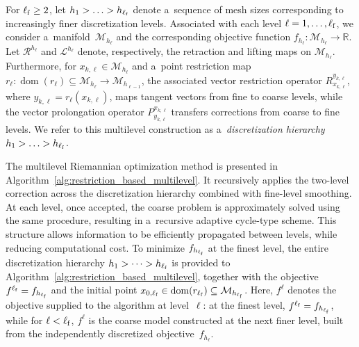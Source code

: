 \documentclass[11pt,reqno]{amsart}
\theoremstyle{plain}
\newcommand\R{\mathbb R}
\DeclareMathOperator{\dom}{dom}
\def\restr{r}
\newcommand{\M}{\mathcal{M}}
\newcommand{\Ret}{\mathcal R}
\newcommand{\invRet}{\mathcal L}
\begin{document}
	For $\ell_{\rm f}\ge2$, let $h_1 > \ldots > h_{\ell_{\rm f}}$ denote a~sequence of mesh sizes corresponding to increasingly finer discretization levels. Associated with each level $\ell=1,\ldots,\ell_{\rm f}$, we consider a~manifold~$\M_{h_\ell}$ and the corresponding objective function $f_{h_\ell}:\M_{h_\ell}\to\R$. Let $\Ret^{h_\ell}$ and $\invRet^{h_\ell}$ denote, respectively, the retraction and lifting maps on $\M_{h_\ell}$. Furthermore, for $x_{k,\ell}\in\M_{h_\ell}$ and a~point restriction map $\restr_\ell : \dom(\restr_\ell) \subseteq \M_{h_\ell} \to \M_{h_{\ell -1}}$, the associated vector restriction operator $R_{x_{k,\ell}}^{y_{k,\ell}}$, where $y_{k,\ell} = \restr_\ell(x_{k,\ell})$, maps tangent vectors from fine to coarse levels, while the vector prolongation operator $P_{y_{k,\ell}}^{x_{k,\ell}}$ transfers corrections from coarse to fine levels. We refer to this multilevel construction as a~\emph{discretization hierarchy} $h_1 > \ldots > h_{\ell_{\rm f}}$.
	
	The multilevel Riemannian optimization method is presented in Algorithm~\ref{alg:restriction_based_multilevel}. It recursively applies the two-level correction across the discretization hierarchy combined with fine-level smoothing. At each level, once accepted, the coarse problem is approximately solved using the same procedure, resulting in a~recursive adaptive cycle-type scheme. This structure allows information to be efficiently propagated between levels, while reducing computational cost. To minimize $f_{h_{\ell_{\rm f}}}$ at the finest level, the entire discretization hierarchy $h_1 > \dots > h_{\ell_{\rm f}}$ is provided to Algorithm~\ref{alg:restriction_based_multilevel}, together with the objective $f^{\ell_{\rm f}} = f_{h_{\ell_{\rm f}}}$ and the initial point $x_{0,\ell_{\rm f}} \in \dom(r_{\ell_{\rm f}})\subseteq\M_{h_{\ell_{\rm f}}}$.
	Here, $f^{\ell}$ denotes the objective supplied to the algorithm at level~$\ell$: at the finest level, $f^{\ell_{\rm f}}=f_{h_{\ell_{\rm f}}}$, while for $\ell<\ell_{\rm f}$, $f^{\ell}$ is the coarse model constructed at the next finer level, built from the independently discretized objective~$f_{h_\ell}$.
	
\end{document}
